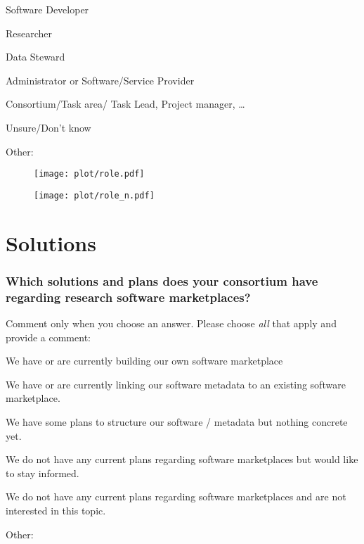 \documentclass[headsepline,titlepage,twoside,12pt,toc=flat,headings=normal]{scrreprt}
\newcommand{\question}[1]{\subsubsection{#1}}
\newcommand{\otherbox}{\fbox{\phantom{This is how big an answer would be.}}}
\begin{document}
\begin{answers}
\item Software Developer
\item Researcher
\item Data Steward
\item Administrator or Software/Service Provider
\item Consortium/Task area/ Task Lead, Project manager, \ldots{}
\item Unsure/Don't know
\item Other: \otherbox
\end{answers}

\begin{figure}[h!]
\texttt{[image: plot/role.pdf]}
\caption{}
\label{fig:role}
\end{figure}

\begin{figure}[h!]
\texttt{[image: plot/role\_n.pdf]}
\caption{}
\label{fig:role_n}
\end{figure}

\section{Solutions}
\question{Which solutions and plans does your consortium have regarding research software marketplaces?}

Comment only when you choose an answer.
Please choose \emph{all} that apply and provide a comment:

\begin{answers}
\item We have or are currently building our own software marketplace
\item We have or are currently linking our software metadata to an existing software marketplace.
\item We have some plans to structure our software / metadata but nothing concrete yet.
\item We do not have any current plans regarding software marketplaces but would like to stay informed.
\item We do not have any current plans regarding software marketplaces and are not interested in this topic.
\item Other: \otherbox
\end{answers}
\end{document}
